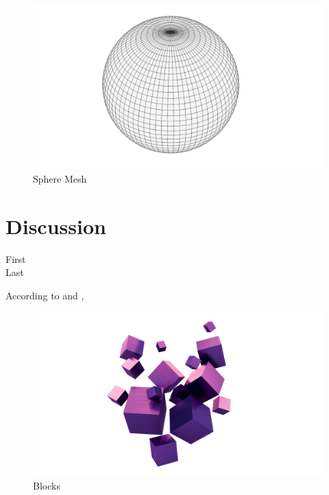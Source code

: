 \documentclass[	DIV=calc,%
							paper=a4,%
							fontsize=12pt,%
							twocolumn]{scrartcl}	 					%
\begin{document}
\begin{figure}[H]
    \centering
    \includegraphics[width=\columnwidth]{7.png}
    \caption{Sphere Mesh}
    \label{Figure 1}
\end{figure}

\section*{Discussion}
\; \; %
\lipsum[7]

\begin{description}
	\item[First] \lipsum[30] 
	\item[Last] \lipsum[30] 
\end{description}

\lipsum[3] 
According to \citet{Ref1} and \citet{Ref2}, %
\lipsum[2] 

\begin{figure}[H] %
    \centering
    \includegraphics[width=\columnwidth]{13.png}
    \caption{Blocks}
    \label{Figure 2}
\end{figure}
\end{document}
